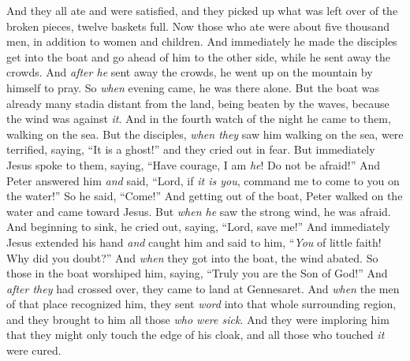 \begin{biblechapter}
\verse And they all ate and were satisfied, and they picked up what was left over of the broken pieces, twelve baskets full.
\verse Now those who ate were about five thousand men, in addition to women and children.
 And immediately he made the disciples get into the boat and go ahead of him to the other side, while he sent away the crowds.
\verse And \textit{after he} sent away the crowds, he went up on the mountain by himself to pray. So \textit{when} evening came, he was there alone.
\verse But the boat was already many stadia distant from the land, being beaten by the waves, because the wind was against \textit{it}.
\verse And in the fourth watch of the night he came to them, walking on the sea.
\verse But the disciples, \textit{when they} saw him walking on the sea, were terrified, saying, “It is a ghost!” and they cried out in fear.
\verse But immediately Jesus spoke to them, saying, “Have courage, I am \textit{he}! Do not be afraid!”
\verse And Peter answered him \textit{and} said, “Lord, if \textit{it is you}, command me to come to you on the water!”
\verse So he said, “Come!” And getting out of the boat, Peter walked on the water and came toward Jesus.
\verse But \textit{when he} saw the strong wind, he was afraid. And beginning to sink, he cried out, saying, “Lord, save me!”
\verse And immediately Jesus extended his hand \textit{and} caught him and said to him, “\textit{You} of little faith! Why did you doubt?”
\verse And \textit{when} they got into the boat, the wind abated.
\verse So those in the boat worshiped him, saying, “Truly you are the Son of God!”
 And \textit{after they} had crossed over, they came to land at Gennesaret.
\verse And \textit{when} the men of that place recognized him, they sent \textit{word} into that whole surrounding region, and they brought to him all those \textit{who were sick}.
\verse And they were imploring him that they might only touch the edge of his cloak, and all those who touched \textit{it} were cured.
\end{biblechapter}

